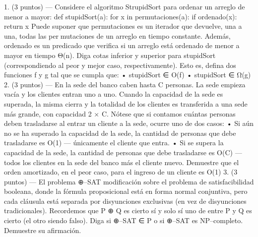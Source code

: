 1. (3 puntos) — Considere el algoritmo StrupidSort para ordenar un arreglo de menor a
mayor:
def stupidSort(a):
for x in permutaciones(a):
if ordenado(x):
return x
Puede suponer que permutaciones es un iterador que devuelve, una a una, todas las permutaciones de un arreglo en tiempo constante. Además, ordenado es un predicado que
verifica si un arreglo está ordenado de menor a mayor en tiempo Θ(n).
Diga cotas inferior y superior para stupidSort (correspondiendo al peor y mejor caso,
respectivamente). Esto es, defina dos funciones f y g tal que se cumpla que:
• stupidSort ∈ O(f) • stupidSort ∈ Ω(g)
2. (3 puntos) — En la sede del banco caben hasta C personas. La sede empieza vacía y los
clientes entran uno a uno. Cuando la capacidad de la sede es superada, la misma cierra y
la totalidad de los clientes es transferida a una sede más grande, con capacidad 2 × C.
Nótese que si contamos cuántas personas deben trasladarse al entrar un cliente a la sede,
ocurre uno de dos casos:
• Si aún no se ha superado la capacidad de la sede, la cantidad de personas que debe
trasladarse es O(1) — únicamente el cliente que entra.
• Si se supera la capacidad de la sede, la cantidad de personas que debe trasladarse es
O(C) — todos los clientes en la sede del banco más el cliente nuevo.
Demuestre que el orden amortizado, en el peor caso, para el ingreso de un cliente es O(1)
3. (3 puntos) — El problema ⊕–SAT modificación sobre el problema de satisfacibilidad booleana,
donde la fórmula proposicional está en forma normal conjuntiva, pero cada cláusula está
separada por disyunciones exclusivas (en vez de disyunciones tradicionales).
Recordemos que P ⊕ Q es cierto sí y solo sí uno de entre P y Q es cierto (el otro siendo
falso).
Diga si ⊕–SAT ∈ P o si ⊕–SAT es NP–completo. Demuestre su afirmación.
